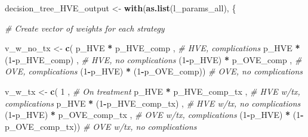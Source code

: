 \documentclass[
]{article}
\newenvironment{Shaded}{\begin{snugshade}}{\end{snugshade}}
\newcommand{\CommentTok}[1]{\textcolor[rgb]{0.56,0.35,0.01}{\textit{#1}}}
\newcommand{\DecValTok}[1]{\textcolor[rgb]{0.00,0.00,0.81}{#1}}
\newcommand{\KeywordTok}[1]{\textcolor[rgb]{0.13,0.29,0.53}{\textbf{#1}}}
\newcommand{\NormalTok}[1]{#1}
\newcommand{\OperatorTok}[1]{\textcolor[rgb]{0.81,0.36,0.00}{\textbf{#1}}}
\newcommand{\StringTok}[1]{\textcolor[rgb]{0.31,0.60,0.02}{#1}}
\begin{document}
\begin{Shaded}
\begin{Highlighting}[]
\NormalTok{decision_tree_HVE_output <-}\StringTok{ }\KeywordTok{with}\NormalTok{(}\KeywordTok{as.list}\NormalTok{(l_params_all), \{}
  
  \CommentTok{# Create vector of weights for each strategy }
  
\NormalTok{  v_w_no_tx  <-}\StringTok{ }\KeywordTok{c}\NormalTok{(  p_HVE  }\OperatorTok{*}\StringTok{    }\NormalTok{p_HVE_comp  ,  }\CommentTok{# HVE, complications}
\NormalTok{                    p_HVE  }\OperatorTok{*}\StringTok{ }\NormalTok{(}\DecValTok{1}\OperatorTok{-}\NormalTok{p_HVE_comp) ,  }\CommentTok{# HVE, no complications}
\NormalTok{                 (}\DecValTok{1}\OperatorTok{-}\NormalTok{p_HVE) }\OperatorTok{*}\StringTok{    }\NormalTok{p_OVE_comp  ,  }\CommentTok{# OVE, complications}
\NormalTok{                 (}\DecValTok{1}\OperatorTok{-}\NormalTok{p_HVE) }\OperatorTok{*}\StringTok{ }\NormalTok{(}\DecValTok{1}\OperatorTok{-}\NormalTok{p_OVE_comp))   }\CommentTok{# OVE, no complications}
  
\NormalTok{  v_w_tx     <-}\StringTok{ }\KeywordTok{c}\NormalTok{(  }\DecValTok{1}\NormalTok{                          ,  }\CommentTok{# On treatment}
\NormalTok{                    p_HVE  }\OperatorTok{*}\StringTok{    }\NormalTok{p_HVE_comp_tx  ,  }\CommentTok{# HVE w/tx, complications}
\NormalTok{                    p_HVE  }\OperatorTok{*}\StringTok{ }\NormalTok{(}\DecValTok{1}\OperatorTok{-}\NormalTok{p_HVE_comp_tx) ,  }\CommentTok{# HVE w/tx, no complications}
\NormalTok{                 (}\DecValTok{1}\OperatorTok{-}\NormalTok{p_HVE) }\OperatorTok{*}\StringTok{    }\NormalTok{p_OVE_comp_tx  ,  }\CommentTok{# OVE w/tx, complications}
\NormalTok{                 (}\DecValTok{1}\OperatorTok{-}\NormalTok{p_HVE) }\OperatorTok{*}\StringTok{ }\NormalTok{(}\DecValTok{1}\OperatorTok{-}\NormalTok{p_OVE_comp_tx))   }\CommentTok{# OVE w/tx, no complications}
  

\end{Highlighting}
\end{Shaded}
\end{document}
